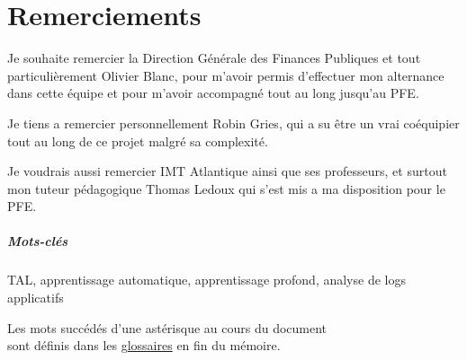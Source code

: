 \documentclass[openany, 11pt]{memoir}
\newcommand\chapters[1]{
	\chapter*{#1}
	\addcontentsline{toc}{chapter}{#1}
}
\begin{document}
\newpage
{}
\tableofcontents
{}

\newpage
\chapters{Remerciements}
Je souhaite remercier la Direction Générale des Finances Publiques et tout particulièrement Olivier Blanc, pour m'avoir permis d'effectuer mon alternance dans cette équipe et pour m'avoir accompagné tout au long jusqu'au PFE.

\bigskip
Je tiens a remercier personnellement Robin Gries, qui a su être un vrai coéquipier tout au long de ce projet malgré sa complexité.

\bigskip
Je voudrais aussi remercier IMT Atlantique ainsi que ses professeurs, et surtout mon tuteur pédagogique Thomas Ledoux qui s'est mis a ma disposition pour le PFE.

\newpage
\begin{abstract}
Les \glspl{log} sont une source importante de données détaillant le fonctionnement interne d'une application, mais ne sont pourtant que rarement utilisés a leur plein potentiel. Dans ce mémoire, je vais détailler le processus d'évolution d'un outil d'\gls{ml} qui utilise les logs pour détecter et même tenter de prévoir des anomalies logicielles. Un état de l'art des méthodes d'analyse de logs existante a été compilé, ainsi qu'une analyse des fichiers de logs disponibles. Ensuite, une implémentation des algorithmes a été faite à l'aide d'une réécriture de l'architecture du projet.
\end{abstract}

{ 
\begin{abstract}
\Glspl{log} are an important source of data when it comes to the internal workings of software, but they are rarely used to their full potential. In this memoir, I will explain the evolution of a machine learning tool which uses \glspl{log} to detect and even attempt to predict software anomalies. A state of the art of existing log analysis methods was compiled, as well as an analysis of available log files. Then, an implementation of the algorithms was made using a rewritten project architecture.
\end{abstract}}

\paragraph{Mots-clés}
\gls{TAL}, apprentissage automatique, apprentissage profond, analyse de logs applicatifs

\newpage
\begin{center}
	\vspace*{\fill}
	Les mots succédés d'une astérisque au cours du document\\
	sont définis dans les \hyperref[glos]{glossaires} en fin du mémoire.
    \vspace*{\fill}
\end{center}
\end{document}
